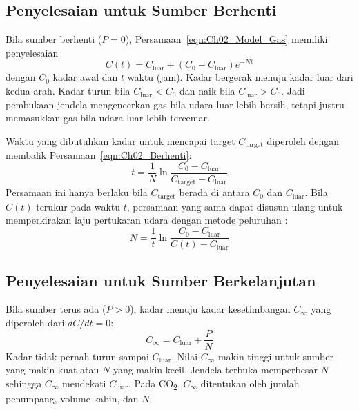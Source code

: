     \subsection{Penyelesaian untuk Sumber Berhenti}

    Bila sumber berhenti ($P = 0$), Persamaan~\ref{eqn:Ch02_Model_Gas} memiliki penyelesaian
    \begin{equation}
        \label{eqn:Ch02_Berhenti}
        C(t) = C_{\text{luar}} + \left(C_{0} - C_{\text{luar}}\right)e^{-Nt}
    \end{equation}
    dengan $C_{0}$ kadar awal dan $t$ waktu (jam). Kadar bergerak menuju kadar luar dari kedua arah. Kadar turun bila $C_{\text{luar}} < C_{0}$ dan naik bila $C_{\text{luar}} > C_{0}$. Jadi pembukaan jendela mengencerkan gas bila udara luar lebih bersih, tetapi justru memasukkan gas bila udara luar lebih tercemar.

    Waktu yang dibutuhkan kadar untuk mencapai target $C_{\text{target}}$ diperoleh dengan membalik Persamaan~\ref{eqn:Ch02_Berhenti}:
    \begin{equation}
        \label{eqn:Ch02_Waktu_Target}
        t = \frac{1}{N}\ln\frac{C_{0} - C_{\text{luar}}}{C_{\text{target}} - C_{\text{luar}}}
    \end{equation}
    Persamaan ini hanya berlaku bila $C_{\text{target}}$ berada di antara $C_{0}$ dan $C_{\text{luar}}$. Bila $C(t)$ terukur pada waktu $t$, persamaan yang sama dapat disusun ulang untuk memperkirakan laju pertukaran udara dengan metode peluruhan \cite{ashrae_co2}:
    \begin{equation}
        \label{eqn:Ch02_Estimasi_N}
        N = \frac{1}{t}\ln\frac{C_{0} - C_{\text{luar}}}{C(t) - C_{\text{luar}}}
    \end{equation}

    \subsection{Penyelesaian untuk Sumber Berkelanjutan}

    Bila sumber terus ada ($P > 0$), kadar menuju kadar kesetimbangan $C_{\infty}$ yang diperoleh dari $dC/dt = 0$:
    \begin{equation}
        \label{eqn:Ch02_Kesetimbangan}
        C_{\infty} = C_{\text{luar}} + \frac{P}{N}
    \end{equation}
    Kadar tidak pernah turun sampai $C_{\text{luar}}$. Nilai $C_{\infty}$ makin tinggi untuk sumber yang makin kuat atau $N$ yang makin kecil. Jendela terbuka memperbesar $N$ sehingga $C_{\infty}$ mendekati $C_{\text{luar}}$. Pada CO\textsubscript{2}, $C_{\infty}$ ditentukan oleh jumlah penumpang, volume kabin, dan $N$.

